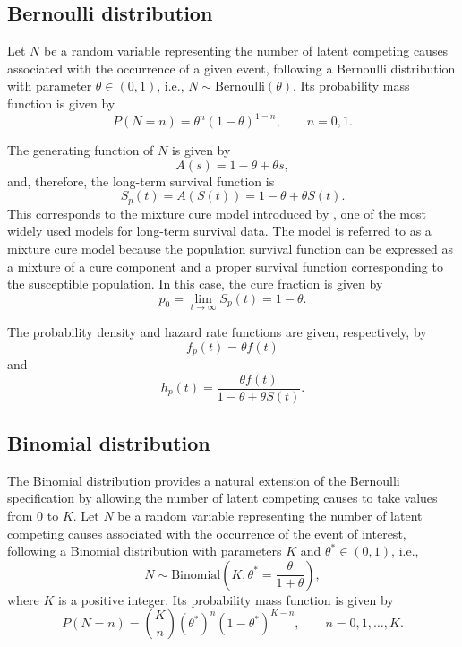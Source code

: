 \subsection{Bernoulli distribution}

Let $N$ be a random variable representing the number of latent competing causes
associated with the occurrence of a given event, following a Bernoulli distribution with
parameter $\theta \in (0,1)$, i.e., $N \sim \text{Bernoulli}(\theta)$. Its probability
mass function is given by
\begin{equation}
P(N=n)
=
\theta^{n}(1-\theta)^{1-n},
\qquad n=0,1.
\end{equation}

The generating function of $N$ is given by
\[
A(s)=1-\theta+\theta s,
\]
and, therefore, the long-term survival function is
\begin{equation}
S_p(t)
=
A\left(S(t)\right)
=
1-\theta+\theta S(t).
\end{equation}
This corresponds to the mixture cure model introduced by \cite{berkson1952survival}, one
of the most widely used models for long-term survival data. The model is referred to as
a mixture cure model because the population survival function can be expressed as a
mixture of a cure component and a proper survival function corresponding to the
susceptible population. In this case, the cure fraction is given by
\begin{equation}
p_0
=
\lim_{t\to\infty}S_p(t)
=
1-\theta.
\end{equation}

The probability density and hazard rate functions are given, respectively, by
\begin{equation}
f_p(t)
=
\theta f(t)
\end{equation}
and
\begin{equation}
h_p(t)
=
\frac{\theta f(t)}
{1-\theta+\theta S(t)}.
\end{equation}

\subsection{Binomial distribution}

The Binomial distribution provides a natural extension of the Bernoulli specification by
allowing the number of latent competing causes to take values from $0$ to $K$. Let $N$
be a random variable representing the number of latent competing causes associated with
the occurrence of the event of interest, following a Binomial distribution with
parameters $K$ and $\theta^*\in(0,1)$, i.e.,
\[
N\sim\mathrm{Binomial}\left(K,\theta^* = \frac{\theta}{1 + \theta}\right),
\]
where $K$ is a positive integer. Its probability mass function is given by
\begin{equation}
\label{eq:binomial_pmf}
P(N=n)
=
\binom{K}{n}
\left(\theta^*\right)^n\left(1-\theta^*\right)^{K-n},
\qquad n=0,1,\ldots,K.
\end{equation}

